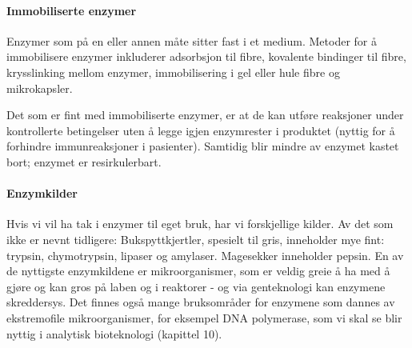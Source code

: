 \paragraph{Immobiliserte enzymer} Enzymer som på en eller annen måte sitter fast i et medium. Metoder for å immobilisere enzymer inkluderer adsorbsjon til fibre, kovalente bindinger til fibre, krysslinking mellom enzymer, immobilisering i gel eller hule fibre og mikrokapsler. 

Det som er fint med immobiliserte enzymer, er at de kan utføre reaksjoner under kontrollerte betingelser uten å legge igjen enzymrester i produktet (nyttig for å forhindre immunreaksjoner i pasienter). Samtidig blir mindre av enzymet kastet bort; enzymet er resirkulerbart. 

\paragraph{Enzymkilder} Hvis vi vil ha tak i enzymer til eget bruk, har vi forskjellige kilder. Av det som ikke er nevnt tidligere: Bukspyttkjertler, spesielt til gris, inneholder mye fint: trypsin, chymotrypsin, lipaser og amylaser. Magesekker inneholder pepsin. En av de nyttigste enzymkildene er mikroorganismer, som er veldig greie å ha med å gjøre og kan gros på laben og i reaktorer - og via genteknologi kan enzymene skreddersys. Det finnes også mange bruksområder for enzymene som dannes av ekstremofile mikroorganismer, for eksempel DNA polymerase, som vi skal se blir nyttig i analytisk bioteknologi (kapittel 10).